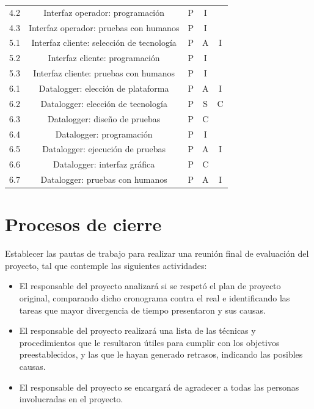 \documentclass[
12pt,
spanish,
singlespacing,
parskip,
headsepline,]{article}
\begin{document}
\begin{table}[H]
\begin{tabular}{ccccc}
		4.2 & Interfaz operador: programación & P & I & \\
		4.3 & Interfaz operador: pruebas con humanos & P & I & \\ \hline
		5.1 & Interfaz cliente: selección de tecnología & P & A & I \\
		5.2 & Interfaz cliente: programación & P & I & \\
		5.3 & Interfaz cliente: pruebas con humanos & P & I & \\ \hline
		6.1 & Datalogger: elección de plataforma & P & A & I \\
		6.2 & Datalogger: elección de tecnología & P & S & C \\
		6.3 & Datalogger: diseño de pruebas & P & C & \\
		6.4 & Datalogger: programación & P & I & \\
		6.5 & Datalogger: ejecución de pruebas & P & A & I \\
		6.6 & Datalogger: interfaz gráfica & P & C & \\
		6.7 & Datalogger: pruebas con humanos & P & A & I \\ \hline
		
	\end{tabular}
\end{table}

\section{Procesos de cierre}

Establecer las pautas de trabajo para realizar una reunión final de evaluación del proyecto, tal que contemple las siguientes actividades:

\begin{itemize}
	\item El responsable del proyecto analizará si se respetó el plan de proyecto original, comparando dicho cronograma contra el real e identificando las tareas que mayor divergencia de tiempo presentaron y sus causas.
	\item El responsable del proyecto realizará una lista de las técnicas y procedimientos que le resultaron útiles para cumplir con los objetivos preestablecidos, y las que le hayan generado retrasos, indicando las posibles causas.
	\item El responsable del proyecto se encargará de agradecer a todas las personas involucradas en el proyecto.
\end{itemize}
\end{document}

